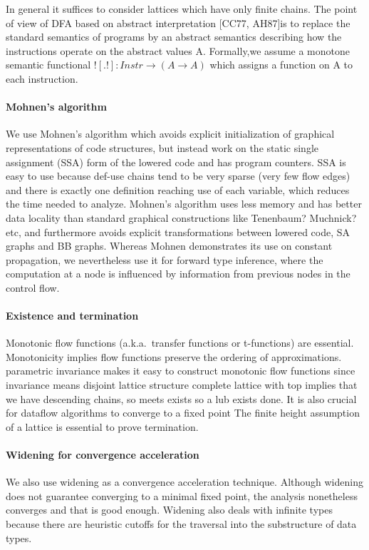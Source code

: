 \documentclass[pldi]{sigplanconf-pldi15}
\begin{document}
In general it suffices to consider lattices which have only finite chains. The
point of view of DFA based on abstract interpretation [CC77, AH87]is to replace
the standard semantics of programs by an abstract semantics describing how the
instructions operate on the abstract values A. Formally,we assume a
monotone semantic functional $![.!] : Instr \rightarrow (A \rightarrow A)$
which assigns a function on A to each instruction.

\paragraph{Mohnen's algorithm}
We use Mohnen's algorithm which avoids explicit initialization of graphical
representations of code structures, but instead work on the static single
assignment (SSA) form of the lowered code and has program counters. SSA is easy
to use because def-use chains tend to be very sparse (very few flow edges) and
there is exactly one definition reaching use of each variable, which reduces
the time needed to analyze. Mohnen's algorithm uses less memory and has better
data locality than standard graphical constructions like Tenenbaum? Muchnick?
etc, and furthermore avoids explicit transformations between lowered code, SA
graphs and BB graphs. Whereas Mohnen demonstrates its use on constant
propagation, we nevertheless use it for forward type inference, where the
computation at a node is influenced by information from previous nodes in the
control flow.

\paragraph{Existence and termination}
Monotonic flow functions (a.k.a.\ transfer functions or t-functions) are essential.
Monotonicity implies flow functions preserve the ordering of approximations.
parametric invariance makes it easy to construct monotonic flow functions since invariance means disjoint lattice structure
complete lattice with top implies that we have descending chains, so meets exists so a lub exists done.
It is also crucial for dataflow algorithms to converge to a fixed point
The finite height assumption of a lattice is essential to prove termination.

\paragraph{Widening for convergence acceleration}
We also use widening as a convergence acceleration technique. Although widening
does not guarantee converging to a minimal fixed point, the analysis
nonetheless converges and that is good enough.  Widening also deals with
infinite types because there are heuristic cutoffs for the traversal into the
substructure of data types.
\end{document}
